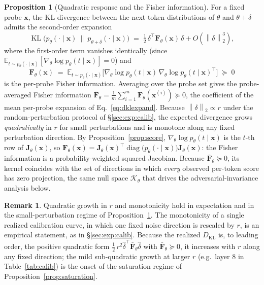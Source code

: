 \documentclass[11pt]{article}
\newcommand{\E}{\mathbb{E}}
\newcommand{\norm}[1]{\left\lVert #1 \right\rVert}
\newcommand{\KL}{\operatorname{KL}}
\theoremstyle{definition}
\newtheorem{proposition}{Proposition}
\newtheorem{remark}{Remark}
\begin{document}
\begin{proposition}[Quadratic response and the Fisher information]
\label{prop:fisher}
For a fixed probe $\bm{x}$, the KL divergence between the next-token
distributions of $\theta$ and $\theta + \delta$ admits the second-order
expansion
\begin{equation}
  \KL\!\big(p_\theta(\cdot \mid \bm{x})\ \|\ p_{\theta+\delta}(\cdot \mid \bm{x})\big)
  \;=\; \tfrac12\, \delta^\top \bm{F}_\theta(\bm{x})\, \delta
      + O(\norm{\delta}_2^3),
  \label{eq:fisherexpand}
\end{equation}
where the first-order term vanishes identically (since
$\E_{t \sim p_\theta(\cdot \mid \bm{x})}[\nabla_\theta \log p_\theta(t \mid \bm{x})] = 0$)
and
\begin{equation}
  \bm{F}_\theta(\bm{x})
  \;=\; \E_{t \sim p_\theta(\cdot \mid \bm{x})}
      \big[\nabla_\theta \log p_\theta(t \mid \bm{x})
          \,\nabla_\theta \log p_\theta(t \mid \bm{x})^\top\big]
  \;\succeq\; 0
  \label{eq:fisher}
\end{equation}
is the per-probe Fisher information. Averaging over the probe set gives the
probe-averaged Fisher information $\bar{\bm{F}}_\theta = \frac1m \sum_{i=1}^m
\bm{F}_\theta(\bm{x}^{(i)}) \succeq 0$, the coefficient of the mean per-probe
expansion of Eq.~\eqref{eq:dklexpand}. Because $\norm{\delta}_2 \propto r$ under
the random-perturbation protocol of \S\ref{sec:exp:calib}, the expected
divergence grows \emph{quadratically} in $r$ for small perturbations and is
monotone along any fixed perturbation direction. By
Proposition~\ref{prop:score}, $\nabla_\theta \log p_\theta(t \mid \bm{x})$ is
the $t$-th row of $\bm{J}_\theta(\bm{x})$, so
$\bm{F}_\theta(\bm{x}) = \bm{J}_\theta(\bm{x})^\top
\operatorname{diag}\!\big(p_\theta(\cdot \mid \bm{x})\big)
\bm{J}_\theta(\bm{x})$: the Fisher information is a probability-weighted squared
Jacobian. Because $\bar{\bm{F}}_\theta \succeq 0$, its kernel coincides with the
set of directions in which \emph{every} observed per-token score has zero
projection, the same null space $\mathcal{K}_\theta$ that drives the
adversarial-invariance analysis below.
\end{proposition}

\begin{remark}
\label{rem:linearity}
Quadratic growth in $r$ and monotonicity hold in expectation and in the
small-perturbation regime of Proposition~\ref{prop:fisher}. The monotonicity of
a single realized calibration curve, in which one fixed noise direction is
rescaled by $r$, is an empirical statement, as in \S\ref{sec:exp:calib}.
Because the realized $D_{\mathrm{KL}}$ is, to leading order, the positive
quadratic form $\tfrac12\, r^2 \hat\delta^\top \bar{\bm{F}}_\theta \hat\delta$
with $\bar{\bm{F}}_\theta \succeq 0$, it increases with $r$ along any fixed
direction; the mild sub-quadratic growth at larger $r$ (e.g.\ layer $8$ in
Table~\ref{tab:calib}) is the onset of the saturation regime of
Proposition~\ref{prop:saturation}.
\end{remark}
\end{document}
